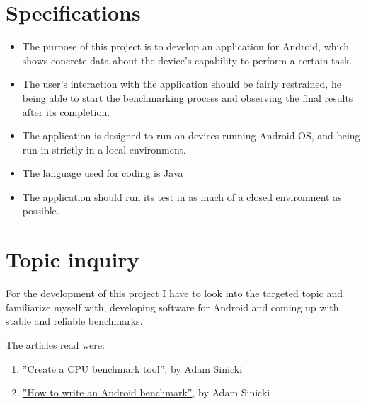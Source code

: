 \documentclass[a4paper,10pt]{report}
\begin{document}
\section{Specifications}
 \begin{itemize}
 \item The purpose of this project is to develop an application for Android, which shows concrete data about the device's capability to perform a certain task.
 \item The user's interaction with the application should be fairly restrained, he being able to start the benchmarking process and observing the final results after its completion.
 \item The application is designed to run on devices running Android OS, and being run in strictly in a local environment.
 \item The language used for coding is Java
 \item The application should run its test in as much of a closed environment as possible. %
 \end{itemize}

\section{Topic inquiry}
 For the development of this project I have to look into the targeted topic and familiarize myself with, developing software for Android and coming up with stable and reliable benchmarks.

 The articles read were:
 \begin{enumerate}
 \item \href{https://www.androidauthority.com/write-an-android-cpu-benchmark-part-1-679929/}{''Create a CPU benchmark tool''}, by Adam Sinicki
 \item \href{https://www.androidauthority.com/write-an-android-cpu-benchmark-tool-part-2-681455/}{''How to write an Android benchmark''}, by Adam Sinicki
 \end{enumerate}
\end{document}
